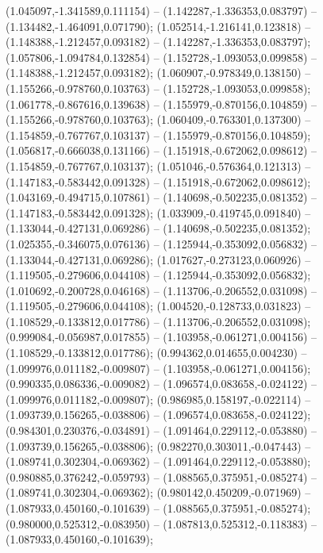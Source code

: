  (1.045097,-1.341589,0.111154) -- (1.142287,-1.336353,0.083797) -- (1.134482,-1.464091,0.071790);
 (1.052514,-1.216141,0.123818) -- (1.148388,-1.212457,0.093182) -- (1.142287,-1.336353,0.083797);
 (1.057806,-1.094784,0.132854) -- (1.152728,-1.093053,0.099858) -- (1.148388,-1.212457,0.093182);
 (1.060907,-0.978349,0.138150) -- (1.155266,-0.978760,0.103763) -- (1.152728,-1.093053,0.099858);
 (1.061778,-0.867616,0.139638) -- (1.155979,-0.870156,0.104859) -- (1.155266,-0.978760,0.103763);
 (1.060409,-0.763301,0.137300) -- (1.154859,-0.767767,0.103137) -- (1.155979,-0.870156,0.104859);
 (1.056817,-0.666038,0.131166) -- (1.151918,-0.672062,0.098612) -- (1.154859,-0.767767,0.103137);
 (1.051046,-0.576364,0.121313) -- (1.147183,-0.583442,0.091328) -- (1.151918,-0.672062,0.098612);
 (1.043169,-0.494715,0.107861) -- (1.140698,-0.502235,0.081352) -- (1.147183,-0.583442,0.091328);
 (1.033909,-0.419745,0.091840) -- (1.133044,-0.427131,0.069286) -- (1.140698,-0.502235,0.081352);
 (1.025355,-0.346075,0.076136) -- (1.125944,-0.353092,0.056832) -- (1.133044,-0.427131,0.069286);
 (1.017627,-0.273123,0.060926) -- (1.119505,-0.279606,0.044108) -- (1.125944,-0.353092,0.056832);
 (1.010692,-0.200728,0.046168) -- (1.113706,-0.206552,0.031098) -- (1.119505,-0.279606,0.044108);
 (1.004520,-0.128733,0.031823) -- (1.108529,-0.133812,0.017786) -- (1.113706,-0.206552,0.031098);
 (0.999084,-0.056987,0.017855) -- (1.103958,-0.061271,0.004156) -- (1.108529,-0.133812,0.017786);
 (0.994362,0.014655,0.004230) -- (1.099976,0.011182,-0.009807) -- (1.103958,-0.061271,0.004156);
 (0.990335,0.086336,-0.009082) -- (1.096574,0.083658,-0.024122) -- (1.099976,0.011182,-0.009807);
 (0.986985,0.158197,-0.022114) -- (1.093739,0.156265,-0.038806) -- (1.096574,0.083658,-0.024122);
 (0.984301,0.230376,-0.034891) -- (1.091464,0.229112,-0.053880) -- (1.093739,0.156265,-0.038806);
 (0.982270,0.303011,-0.047443) -- (1.089741,0.302304,-0.069362) -- (1.091464,0.229112,-0.053880);
 (0.980885,0.376242,-0.059793) -- (1.088565,0.375951,-0.085274) -- (1.089741,0.302304,-0.069362);
 (0.980142,0.450209,-0.071969) -- (1.087933,0.450160,-0.101639) -- (1.088565,0.375951,-0.085274);
 (0.980000,0.525312,-0.083950) -- (1.087813,0.525312,-0.118383) -- (1.087933,0.450160,-0.101639);
